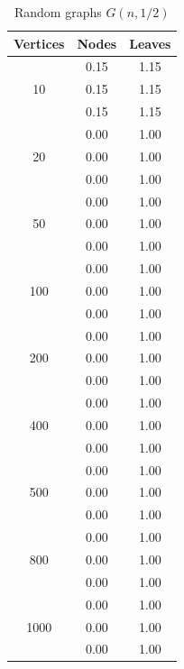 \begin{table}[h]
    \centering
    \begin{tabular}{ccc}
    \toprule
    Vertices & Nodes & Leaves \\
    \midrule
    \multirow{3}{*}{10} & 0.15 & 1.15 \\
     & 0.15 & 1.15 \\
     & 0.15 & 1.15 \\
    \cmidrule(lr){1-3}
    \multirow{3}{*}{20} & 0.00 & 1.00 \\
     & 0.00 & 1.00 \\
     & 0.00 & 1.00 \\
    \cmidrule(lr){1-3}
    \multirow{3}{*}{50} & 0.00 & 1.00 \\
     & 0.00 & 1.00 \\
     & 0.00 & 1.00 \\
    \cmidrule(lr){1-3}
    \multirow{3}{*}{100} & 0.00 & 1.00 \\
     & 0.00 & 1.00 \\
     & 0.00 & 1.00 \\
    \cmidrule(lr){1-3}
    \multirow{3}{*}{200} & 0.00 & 1.00 \\
     & 0.00 & 1.00 \\
     & 0.00 & 1.00 \\
    \cmidrule(lr){1-3}
    \multirow{3}{*}{400} & 0.00 & 1.00 \\
     & 0.00 & 1.00 \\
     & 0.00 & 1.00 \\
    \cmidrule(lr){1-3}
    \multirow{3}{*}{500} & 0.00 & 1.00 \\
     & 0.00 & 1.00 \\
     & 0.00 & 1.00 \\
    \cmidrule(lr){1-3}
    \multirow{3}{*}{800} & 0.00 & 1.00 \\
     & 0.00 & 1.00 \\
     & 0.00 & 1.00 \\
    \cmidrule(lr){1-3}
    \multirow{3}{*}{1000} & 0.00 & 1.00 \\
     & 0.00 & 1.00 \\
     & 0.00 & 1.00 \\
    \bottomrule
    \end{tabular}
    \caption{Random graphs $G(n, 1/2)$}
\end{table}

